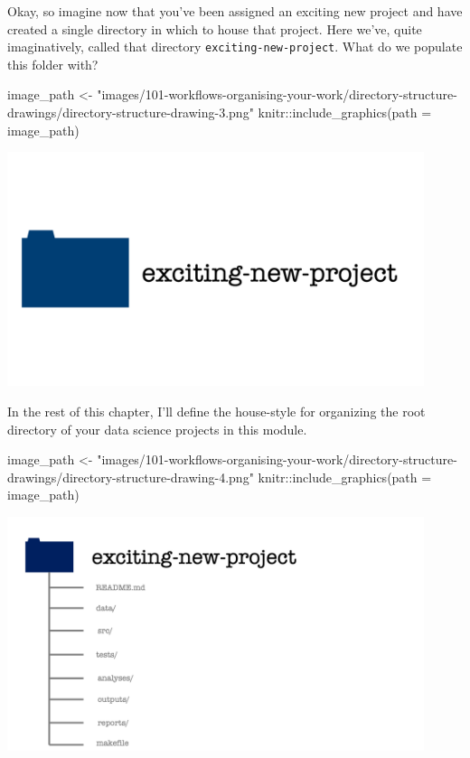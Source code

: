 \documentclass[
  letterpaper,
  DIV=11,
  numbers=noendperiod]{scrreprt}
\newenvironment{Shaded}{\begin{snugshade}}{\end{snugshade}}
\newcommand{\AttributeTok}[1]{\textcolor[rgb]{0.40,0.45,0.13}{#1}}
\newcommand{\FunctionTok}[1]{\textcolor[rgb]{0.28,0.35,0.67}{#1}}
\newcommand{\NormalTok}[1]{\textcolor[rgb]{0.00,0.23,0.31}{#1}}
\newcommand{\OtherTok}[1]{\textcolor[rgb]{0.00,0.23,0.31}{#1}}
\newcommand{\SpecialCharTok}[1]{\textcolor[rgb]{0.37,0.37,0.37}{#1}}
\newcommand{\StringTok}[1]{\textcolor[rgb]{0.13,0.47,0.30}{#1}}
\begin{document}
Okay, so imagine now that you've been assigned an exciting new project
and have created a single directory in which to house that project. Here
we've, quite imaginatively, called that directory
\texttt{exciting-new-project}. What do we populate this folder with?

\begin{Shaded}
\begin{Highlighting}[]
\NormalTok{image\_path }\OtherTok{\textless{}{-}} \StringTok{"images/101{-}workflows{-}organising{-}your{-}work/directory{-}structure{-}drawings/directory{-}structure{-}drawing{-}3.png"}
\NormalTok{knitr}\SpecialCharTok{::}\FunctionTok{include\_graphics}\NormalTok{(}\AttributeTok{path =}\NormalTok{ image\_path)}
\end{Highlighting}
\end{Shaded}

\includegraphics[width=4.8in,height=\textheight]{images/101-workflows-organising-your-work/directory-structure-drawings/directory-structure-drawing-3.png}

In the rest of this chapter, I'll define the house-style for organizing
the root directory of your data science projects in this module.

\begin{Shaded}
\begin{Highlighting}[]
\NormalTok{image\_path }\OtherTok{\textless{}{-}} \StringTok{"images/101{-}workflows{-}organising{-}your{-}work/directory{-}structure{-}drawings/directory{-}structure{-}drawing{-}4.png"}
\NormalTok{knitr}\SpecialCharTok{::}\FunctionTok{include\_graphics}\NormalTok{(}\AttributeTok{path =}\NormalTok{ image\_path)}
\end{Highlighting}
\end{Shaded}

\includegraphics[width=4.8in,height=\textheight]{images/101-workflows-organising-your-work/directory-structure-drawings/directory-structure-drawing-4.png}
\end{document}
